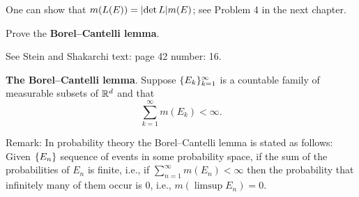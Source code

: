 \documentclass{../homework}
\begin{document}
\begin{problems}
\begin{book}
\begin{enumerate}[start=8]
\begin{problems}
        One can show that \(m(L(E)) = \lvert\det L\rvert m(E)\); see Problem
        4 in the next chapter.
      \end{problems}
    \end{enumerate}
  \end{book}

  \begin{solution}
    \begin{problems}
    \item
    \item
    \end{problems}
  \end{solution}

\item Prove the \textbf{Borel--Cantelli lemma}.

  See Stein and Shakarchi text: page 42 number: 16.

  \begin{book}
    \textbf{The Borel--Cantelli lemma}.  Suppose
    \(\{E_k\}_{k=1}^\infty\) is a countable family of measurable
    subsets of \(\mathbb R^d\) and that
    \[
      \sum_{k=1}^\infty m(E_k) < \infty.
    \]
  \end{book}

  Remark: In probability theory the Borel--Cantelli lemma is stated as
  follows: Given \(\{E_n\}\) sequence of events in some probability
  space, if the sum of the probabilities of \(E_n\) is finite, i.e.,
  if \(\sum_{n=1}^\infty m(E_n) < \infty\) then the probability that
  infinitely many of them occur is
  \(0\), i.e., \(m(\limsup E_n) = 0\).

  \begin{solution}
  \end{solution}

\end{problems}
\end{document}
